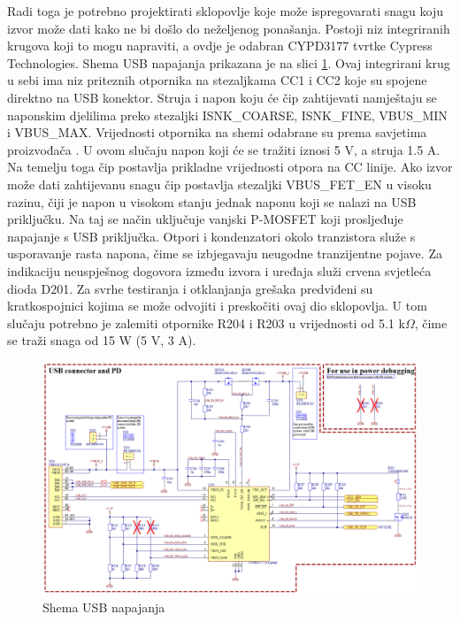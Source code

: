 Radi toga je potrebno projektirati sklopovlje koje može ispregovarati snagu koju izvor može dati kako ne bi došlo do neželjenog ponašanja. Postoji niz integriranih krugova koji to mogu napraviti, a ovdje je odabran CYPD3177 tvrtke Cypress Technologies. Shema USB napajanja prikazana je na slici \ref{slk:MB_USB}. Ovaj integrirani krug u sebi ima niz priteznih otpornika na stezaljkama CC1 i CC2 koje su spojene direktno na USB konektor. Struja i napon koju će čip zahtijevati namještaju se naponskim djelilima preko stezaljki ISNK\_COARSE, ISNK\_FINE, VBUS\_MIN i VBUS\_MAX. Vrijednosti otpornika na shemi odabrane su prema savjetima proizvođača \cite{ct:usb}. U ovom slučaju napon koji će se tražiti iznosi 5 V, a struja 1.5 A. Na temelju toga čip postavlja prikladne vrijednosti otpora na CC linije. Ako izvor može dati zahtijevanu snagu čip postavlja stezaljki VBUS\_FET\_EN u visoku razinu, čiji je napon u visokom stanju jednak naponu koji se nalazi na USB priključku. Na taj se način uključuje vanjski P-MOSFET koji prosljeđuje napajanje s USB priključka. Otpori i kondenzatori okolo tranzistora služe s usporavanje rasta napona, čime se izbjegavaju neugodne tranzijentne pojave. Za indikaciju neuspješnog dogovora između izvora i uređaja služi crvena svjetleća dioda D201. Za svrhe testiranja i otklanjanja grešaka predviđeni su kratkospojnici kojima se može odvojiti i preskočiti ovaj dio sklopovlja. U tom slučaju potrebno je zalemiti otpornike R204 i R203 u vrijednosti od 5.1 k$\Omega$, čime se traži snaga od 15 W (5 V, 3 A).
\begin{figure}
    \centering
    \includegraphics[width=1\textwidth]{Figures/MB_USB.png}
    \caption{Shema USB napajanja}
    \label{slk:MB_USB}
\end{figure}
\pagebreak
